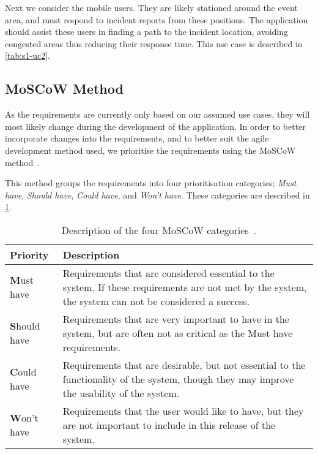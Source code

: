 

Next we consider the mobile users. They are likely stationed around the event area, and must respond to incident reports from these positions. The application should assist these users in finding a path to the incident location, avoiding congested areas thus reducing their response time. This use case is described in \cref{tab:s1-uc2}.



\subsection{MoSCoW Method} \label{ss:s1_moscow}
As the requirements are currently only based on our assumed use cases, they will most likely change during the development of the application. In order to better incorporate changes into the requirements, and to better suit the agile development method used, we prioritise the requirements using the MoSCoW method~\cite{moscow}.

This method groups the requirements into four prioritisation categories; \emph{Must have}, \emph{Should have}, \emph{Could have}, and \emph{Won't have}. These categories are described in \cref{tab:moscow}.

\begin{table}[htbp]
	\centering
	\begin{tabularx}{\textwidth}{lX}
		\toprule
		\textbf{Priority} & \textbf{Description} \\
		\midrule
		\rowcolor[HTML]{EFEFEF} 
		\textbf{M}ust have & Requirements that are considered essential to the system. If these requirements are not met by the system, the system can not be considered a success. \\
		\textbf{S}hould have & Requirements that are very important to have in the system, but are often not as critical as the Must have requirements. \\
		\rowcolor[HTML]{EFEFEF} 
		\textbf{C}ould have & Requirements that are desirable, but not essential to the functionality of the system, though they may improve the usability of the system. \\
		\textbf{W}on't have & Requirements that the user would like to have, but they are not important to include in this release of the system. \\
		\bottomrule
	\end{tabularx}
	\caption{Description of the four MoSCoW categories~\cite{moscow}.}
	\label{tab:moscow}
\end{table}

